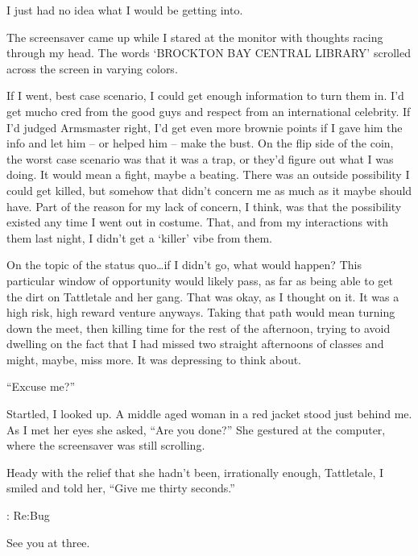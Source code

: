 I just had no idea what I would be getting into.



The screensaver came up while I stared at the monitor with thoughts racing through my head.  The words `BROCKTON BAY CENTRAL LIBRARY' scrolled across the screen in varying colors.



If I went, best case scenario, I could get enough information to turn them in.  I'd get mucho cred from the good guys and respect from an international celebrity.  If I'd judged Armsmaster right, I'd get even more brownie points if I gave him the info and let him – or helped him – make the bust.  On the flip side of the coin, the worst case scenario was that it was a trap, or they'd figure out what I was doing.  It would mean a fight, maybe a beating.  There was an outside possibility I could get killed, but somehow that didn't concern me as much as it maybe should have.  Part of the reason for my lack of concern, I think, was that the possibility existed any time I went out in costume.  That, and from my interactions with them last night, I didn't get a `killer' vibe from them.



On the topic of the status quo\ldots if I didn't go, what would happen?  This particular window of opportunity would likely pass, as far as being able to get the dirt on Tattletale and her gang.  That was okay, as I thought on it.  It was a high risk, high reward venture anyways.  Taking that path would mean turning down the meet, then killing time for the rest of the afternoon, trying to avoid dwelling on the fact that I had missed two straight afternoons of classes and might, maybe, miss more.  It was depressing to think about.



``Excuse me?''



Startled, I looked up.  A middle aged woman in a red jacket stood just behind me.  As I met her eyes she asked, ``Are you done?''  She gestured at the computer, where the screensaver was still scrolling.



Heady with the relief that she hadn't been, irrationally enough, Tattletale, I smiled and told her, ``Give me thirty seconds.''



: Re:Bug



See you at three.





